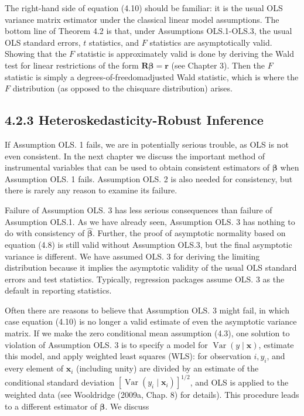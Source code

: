 \documentclass[10pt]{article}
\begin{document}
The right-hand side of equation (4.10) should be familiar: it is the usual OLS variance matrix estimator under the classical linear model assumptions. The bottom line of Theorem 4.2 is that, under Assumptions OLS.1-OLS.3, the usual OLS standard errors, $t$ statistics, and $F$ statistics are asymptotically valid. Showing that the $F$ statistic is approximately valid is done by deriving the Wald test for linear restrictions of the form $\mathbf{R} \boldsymbol{\beta}=\mathbf{r}$ (see Chapter 3). Then the $F$ statistic is simply a degrees-of-freedomadjusted Wald statistic, which is where the $F$ distribution (as opposed to the chisquare distribution) arises.

\subsection*{4.2.3 Heteroskedasticity-Robust Inference}
If Assumption OLS. 1 fails, we are in potentially serious trouble, as OLS is not even consistent. In the next chapter we discuss the important method of instrumental variables that can be used to obtain consistent estimators of $\boldsymbol{\beta}$ when Assumption OLS. 1 fails. Assumption OLS. 2 is also needed for consistency, but there is rarely any reason to examine its failure.

Failure of Assumption OLS. 3 has less serious consequences than failure of Assumption OLS.1. As we have already seen, Assumption OLS. 3 has nothing to do with consistency of $\hat{\boldsymbol{\beta}}$. Further, the proof of asymptotic normality based on equation (4.8) is still valid without Assumption OLS.3, but the final asymptotic variance is different. We have assumed OLS. 3 for deriving the limiting distribution because it implies the asymptotic validity of the usual OLS standard errors and test statistics. Typically, regression packages assume OLS. 3 as the default in reporting statistics.

Often there are reasons to believe that Assumption OLS. 3 might fail, in which case equation (4.10) is no longer a valid estimate of even the asymptotic variance matrix. If we make the zero conditional mean assumption (4.3), one solution to violation of Assumption OLS. 3 is to specify a model for $\operatorname{Var}(y \mid \mathbf{x})$, estimate this model, and apply weighted least squares (WLS): for observation $i, y_{i}$, and every element of $\mathbf{x}_{i}$ (including unity) are divided by an estimate of the conditional standard deviation $\left[\operatorname{Var}\left(y_{i} \mid \mathbf{x}_{i}\right)\right]^{1 / 2}$, and OLS is applied to the weighted data (see Wooldridge (2009a, Chap. 8) for details). This procedure leads to a different estimator of $\boldsymbol{\beta}$. We discuss
\end{document}
